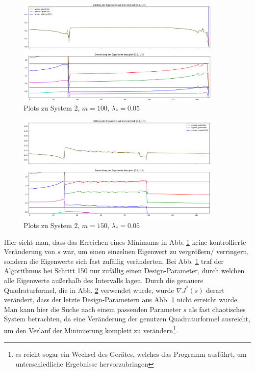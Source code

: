 \documentclass[a4paper,12pt]{report}
\newcommand{\1}{\mathds{1}}
\theoremstyle{plain} %
\theoremstyle{definition} %
\theoremstyle{remark}
\begin{document}
            \begin{figure}[h!t]
                  \centering
                  \includegraphics[width=0.9\textwidth, keepaspectratio]{./Original/Plot_2_100_0.05.png}
                  \caption{Plots zu System 2, $m=100$, $\lambda_*=0.05$}
                  \label{fig: Plot_2_100_0.05}
            \end{figure}

            \begin{figure}[h!t]
                  \centering
                  \includegraphics[width=0.9\textwidth, keepaspectratio]{./Original/Plot_2_150_0.05.png}
                  \caption{Plots zu System 2, $m=150$, $\lambda_*=0.05$}
                  \label{fig: Plot_2_150_0.05}
            \end{figure}

            Hier sieht man, dass das Erreichen eines Minimums in Abb. \ref{fig: Plot_2_100_0.05} keine kontrollierte Veränderung von $s$ war, um einen einzelnen Eigenwert zu vergrößern/ verringern, sondern die Eigenwerte sich fast zufällig veränderten.
            Bei Abb. \ref{fig: Plot_2_100_0.05} traf der Algorithmus bei Schritt 150 nur zufällig einen Design-Parameter, durch welchen alle Eigenwerte außerhalb des Intervalls lagen.
            Durch die genauere Quadraturformel, die in Abb. \ref{fig: Plot_2_150_0.05} verwendet wurde, wurde $\nabla J^*(s)$ derart verändert, dass der letzte Design-Parametern aus Abb. \ref{fig: Plot_2_100_0.05} nicht erreicht wurde.
            Man kann hier die Suche nach einem passenden Parameter $s$ als fast chaotisches System betrachten, da eine Veränderung der genutzen Quadraturformel ausreicht, um den Verlauf der Minimierung komplett zu verändern\footnote{es reicht sogar ein Wechsel des Gerätes, welches das Programm ausführt, um unterschiedliche Ergebnisse hervorzubringen}.
\end{document}

